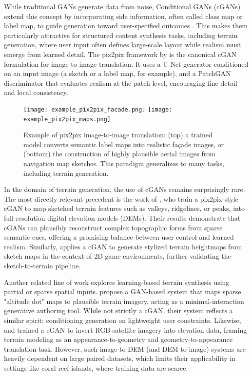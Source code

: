 While traditional GANs generate data from noise, Conditional GANs (cGANs) extend this concept by incorporating side information, often called class map or label map, to guide generation toward user-specified outcomes \cite{Mirza2014}. This makes them particularly attractive for structured content synthesis tasks, including terrain generation, where user input often defines large-scale layout while realism must emerge from learned detail. The pix2pix framework by \citep{Isola2017} is the canonical cGAN formulation for image-to-image translation. It uses a U-Net generator conditioned on an input image (a sketch or a label map, for example), and a PatchGAN discriminator that evaluates realism at the patch level, encouraging fine detail and local consistency.

\begin{figure}[H]
\centering
\texttt{[image: example\_pix2pix\_facade.png]}
\texttt{[image: example\_pix2pix\_maps.png]}
\caption{Example of pix2pix image-to-image translation: (top) a trained model converts semantic label maps into realistic façade images, or (bottom) the construction of highly plausible aerial images from navigation map sketches. This paradigm generalizes to many tasks, including terrain generation.}
\label{fig:coral-island-pix2pix-example}
\end{figure}

In the domain of terrain generation, the use of cGANs remains surprisingly rare. The most directly relevant precedent is the work of \citep{Guerin2017}, who train a pix2pix-style cGAN to map sketched terrain features such as valleys, ridgelines, or peaks, into full-resolution digital elevation models (DEMs). Their results demonstrate that cGANs can plausibly reconstruct complex topographic forms from sparse semantic cues, offering a promising balance between user control and learned realism. Similarly, \citep{Sisodia2022} applies a cGAN to generate stylized terrain heightmaps from sketch maps in the context of 2D game environments, further validating the sketch-to-terrain pipeline.

Another related line of work explores learning-based terrain synthesis using partial or sparse spatial inputs. \citep{Voulgaris2021} propose a GAN-based system that maps sparse "altitude dot" maps to plausible terrain imagery, acting as a minimal-interaction generative authoring tool. While not strictly a cGAN, their system reflects a similar spirit: conditioning generation on lightweight user constraints. Likewise, \cite{Panagiotou2020} and \cite{Beckham2017} trained a cGAN to invert RGB satellite imagery into elevation data, framing terrain modeling as an appearance-to-geometry and geometry-to-appearance translation task. However, such image-to-DEM (and DEM-to-image) systems are heavily dependent on large paired datasets, which limits their applicability in settings like coral reef islands, where training data are scarce.

